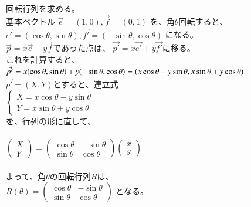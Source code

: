 \documentclass[uplatex]{jsarticle}
\begin{document}
\gt
\fontsize{15pt}{22pt}\selectfont

回転行列を求める。
\\
基本ベクトル
$\vec{e}=(1,0),\vec{f}=(0,1)$
を、角$\theta$回転すると、\\
$\vec{e'}=\left(\cos\theta,\sin\theta\right),\vec{f'}=\left(-\sin\theta,\cos\theta\right)$
になる。
\\


$\vec{p}=x\vec{e}+y\vec{f}$であった点は、
$\vec{p'}=x\vec{e'}+y\vec{f'}$に移る。\\
これを計算すると、\\
$\vec{p'}=x(\cos\theta,\sin\theta)+y(-\sin\theta,\cos\theta)\\
=(x\cos\theta-y\sin\theta,x\sin\theta+y\cos\theta)$.
\\

$\vec{p'}=(X,Y)$とすると、連立式\\

$
\left\{
\begin{array}{l}
X=x\cos\theta-y\sin\theta\\
Y=x\sin\theta+y\cos\theta
\end{array}
\right.
$
\\
を、行列の形に直して、
\\
\\
$
  \left(\begin{array}{rr}X \\ Y \end{array}\right)=
  \left(
    \begin{array}{rr}
      \cos\theta & -\sin\theta \\
      \sin\theta &  \cos\theta
    \end{array}
    \right)
  \left(\begin{array}{rr}x \\ y \end{array}\right)
$
\\
\\
よって、角$\theta$の回転行列$R$は、\\
$
R(\theta)=
  \left(
    \begin{array}{rr}
      \cos\theta & -\sin\theta \\
      \sin\theta &  \cos\theta
    \end{array}
    \right)
$
となる。
\end{document}
